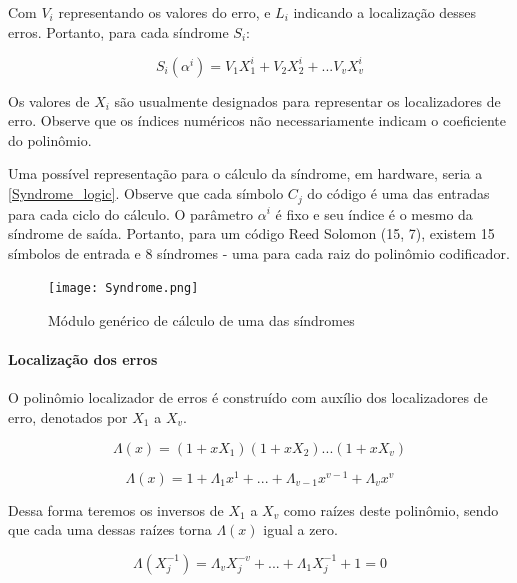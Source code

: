 	Com $V_{i}$ representando os valores do erro, e $L_{i}$ indicando a localização desses erros. Portanto, para cada síndrome $S_{i}$:
	
	\begin{equation}
	S_{i}(\alpha^{i}) = V_{1}X_{1}^{i} + V_{2}X_{2}^{i} + ... V_{v}X_{v}^{i}
	\end{equation}
	
	Os valores de $X_{i}$ são usualmente designados para representar os localizadores de erro. Observe que os índices numéricos não necessariamente indicam o coeficiente do polinômio.
	
	Uma possível representação para o cálculo da síndrome, em hardware, seria a \autoref{Syndrome_logic}. Observe que cada símbolo $C_{j}$ do código é uma das entradas para cada ciclo do cálculo. O parâmetro $\alpha^{i}$ é fixo e seu índice é o mesmo da síndrome de saída. Portanto, para um código Reed Solomon (15, 7), existem 15 símbolos de entrada e 8 síndromes - uma para cada raiz do polinômio codificador.
	
	\begin{figure}[!htb]
		\caption{\label{Syndrome_logic} Módulo genérico de cálculo de uma das síndromes}
		\centering
		\texttt{[image: Syndrome.png]}
	\end{figure}
	
	\paragraph{Localização dos erros}
	
	O polinômio localizador de erros é construído com auxílio dos localizadores de erro, denotados por $X_{1}$ a $X_{v}$.
	
	\begin{equation}
	\Lambda(x) = (1 + xX_{1})(1 + xX_{2})...(1 + xX_{v})
	\end{equation}
	
	\begin{equation}
	\Lambda(x) =  1 + \Lambda_{1}x^{1} + ... + \Lambda_{v-1}x^{v-1} + \Lambda_{v}x^{v}
	\end{equation}
	
	Dessa forma teremos os inversos de $X_{1}$ a $X_{v}$ como raízes deste polinômio, sendo que cada uma dessas raízes torna $\Lambda(x)$ igual a zero. 
	
	\begin{equation}
	\Lambda(X_{j}^{-1}) = \Lambda_{v}X_{j}^{-v} + ... + \Lambda_{1}X_{j}^{-1} + 1 = 0
	\end{equation}
	
